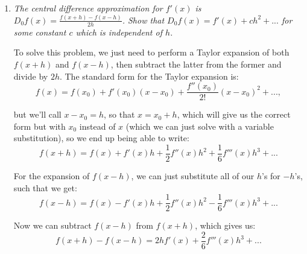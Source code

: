 \begin{enumerate}[label=(\alph*)]
    Although the last two columns are labeled using the same notation as in class,
    these quantities don't converge to finite limits as $h \to 0$. Rather, for each fixed $h$ the entries are finite, but as $h \to 0$ they grow without bound, diverging at rates proportional to $1/h$ and $1/h^2$, respectively. The expressions shown in the bottom row therefore describe the asymptotic growth of these columns rather than true limits.
    \vspace{1em}

    In the table, we can see that $\abs{f'(x)-D_{+}f(x)}/h$ approaches a finite limit, while the higher-order scaled errors diverge. This would imply that the forward-difference method is first-order accurate, which is consistent with what is mentioned in the problem statement.
    \vspace{1em}

  \item \textit{The central difference approximation for $f'(x)$ is $D_{0}f(x) = \frac{f(x+h)-f(x-h)}{2h}$. Show that $D_{0}f(x) = f'(x) + ch^{2} + ...$ for some constant $c$ which is independent of $h$.}
      \vspace{1em}

    To solve this problem, we just need to perform a Taylor expansion of both $f(x+h)$ and $f(x-h)$, then subtract the latter from the former and divide by $2h$. The standard form for the Taylor expansion is:
    \begin{equation*}
      f(x) = f(x_{0}) + f'(x_{0})(x-x_{0}) + \frac{f''(x_{0})}{2!}(x-x_{0})^{2} + ...,
    \end{equation*}

    but we'll call $x-x_{0} = h$, so that $x = x_{0}+h$, which will give us the correct form but with $x_0$ instead of $x$ (which we can just solve with a variable substitution), so we end up being able to write:
    \begin{equation*}
      f(x+h) = f(x) + f'(x)h + \frac{1}{2}f''(x)h^{2} + \frac{1}{6}f'''(x)h^{3} + ...
    \end{equation*}

    For the expansion of $f(x-h)$, we can just substitute all of our $h$'s for $-h$'s, such that we get:
    \begin{equation*}
      f(x-h) = f(x) - f'(x)h + \frac{1}{2}f''(x)h^{2} - \frac{1}{6}f'''(x)h^{3} + ...
    \end{equation*}

    Now we can subtract $f(x-h)$ from $f(x+h)$, which gives us:
    \begin{equation*}
      f(x+h) - f(x-h) = 2hf'(x) + \frac{2}{6}f'''(x)h^{3} + ...
    \end{equation*}


\end{enumerate}
